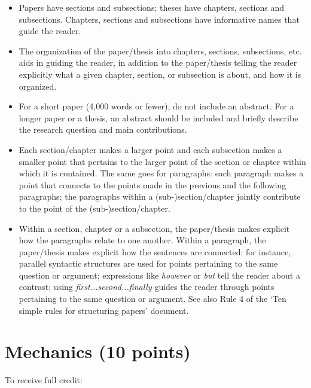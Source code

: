\documentclass[11pt,fleqn,a4paper/thesis]{article}
\newcommand{\6}{\mbox{$[\hspace*{-.6mm}[$}}
\newcommand{\9}{\mbox{$]\hspace*{-.6mm}]$}}
\begin{document}
\begin{itemize}[itemsep=-1pt,leftmargin=2.5ex,topsep=-2pt]

\item Papers have sections and subsections; theses have chapters, sections and subsections. Chapters, sections and subsections have informative names that guide the reader.

\item The organization of the paper/thesis into chapters, sections, subsections, etc. aids in guiding the reader, in addition to the paper/thesis telling the reader explicitly what a given chapter, section, or subsection is about, and how it is organized.

\item For a short paper (4,000 words or fewer), do not include an abstract. For a longer paper or a thesis, an abstract should be included and briefly describe the research question and main contributions.

\item Each section/chapter makes a larger point and each subsection makes a smaller point that pertains to the larger point of the section or chapter within
which it is contained. The same goes for paragraphs: each paragraph makes a point that connects to the points made in the previous and the following
paragraphs; the paragraphs within a (sub-)section/chapter jointly contribute to the point of the (sub-)section/chapter.

\item Within a section, chapter or a subsection, the paper/thesis makes explicit how the paragraphs relate to one another. Within a paragraph, the paper/thesis makes explicit how the sentences are connected: for instance, parallel syntactic structures are used for points pertaining to the same question or argument; expressions like {\em however} or {\em but} tell the reader about a contrast; using {\em first...second...finally} guides the reader through points pertaining to the same question or argument. See also Rule 4 of the `Ten simple rules for structuring papers' document.

\end{itemize}

\section{Mechanics (10 points)}

To receive full credit:
\end{document}
